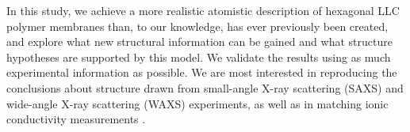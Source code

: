 \documentclass[journal=jpcbfk,manuscript=article]{achemso}
\begin{document}

  In this study, we achieve a more realistic atomistic description of
  hexagonal LLC polymer membranes than, to our knowledge, has ever previously
  been created, and explore what new structural information can be gained and
  what structure hypotheses are supported by this model. We validate the results
  using as much experimental information as possible. We are most interested in
  reproducing the conclusions about structure drawn from small-angle X-ray
  scattering (SAXS) and wide-angle X-ray scattering (WAXS) experiments, as well
  as in matching ionic conductivity measurements \cite{feng_thin_2016}.
\end{document}

